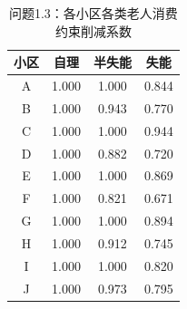 \begin{table}[h]
\centering
\caption{问题1.3：各小区各类老人消费约束削减系数}
\begin{tabular}{|c|c|c|c|}
\hline
小区 & 自理 & 半失能 & 失能 \\
\hline
A & 1.000 & 1.000 & 0.844 \\
B & 1.000 & 0.943 & 0.770 \\
C & 1.000 & 1.000 & 0.944 \\
D & 1.000 & 0.882 & 0.720 \\
E & 1.000 & 1.000 & 0.869 \\
F & 1.000 & 0.821 & 0.671 \\
G & 1.000 & 1.000 & 0.894 \\
H & 1.000 & 0.912 & 0.745 \\
I & 1.000 & 1.000 & 0.820 \\
J & 1.000 & 0.973 & 0.795 \\
\hline
\end{tabular}
\end{table}
